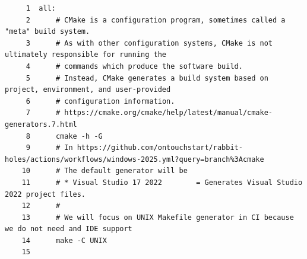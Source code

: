 \begin{verbatim}
     1	all:
     2		# CMake is a configuration program, sometimes called a "meta" build system. 
     3		# As with other configuration systems, CMake is not ultimately responsible for running the 
     4		# commands which produce the software build. 
     5		# Instead, CMake generates a build system based on project, environment, and user-provided 
     6		# configuration information.
     7		# https://cmake.org/cmake/help/latest/manual/cmake-generators.7.html
     8		cmake -h -G
     9		# In https://github.com/ontouchstart/rabbit-holes/actions/workflows/windows-2025.yml?query=branch%3Acmake
    10		# The default generator will be
    11		# * Visual Studio 17 2022        = Generates Visual Studio 2022 project files.
    12		# 
    13		# We will focus on UNIX Makefile generator in CI because we do not need and IDE support
    14		make -C UNIX
    15	
\end{verbatim}
